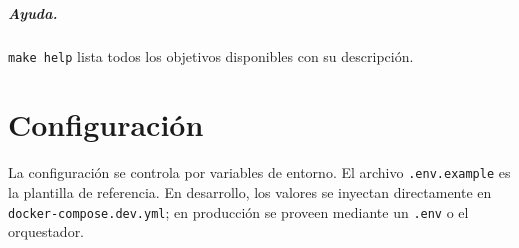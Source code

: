 \documentclass[12pt,letterpaper]{report}
\begin{document}
\paragraph{Ayuda.} \texttt{make help} lista todos los objetivos disponibles con su
descripción.

\chapter{Configuración}

La configuración se controla por variables de entorno. El archivo
\texttt{.env.example} es la plantilla de referencia. En desarrollo, los valores se
inyectan directamente en \texttt{docker-compose.dev.yml}; en producción se
proveen mediante un \texttt{.env} o el orquestador.
\end{document}
